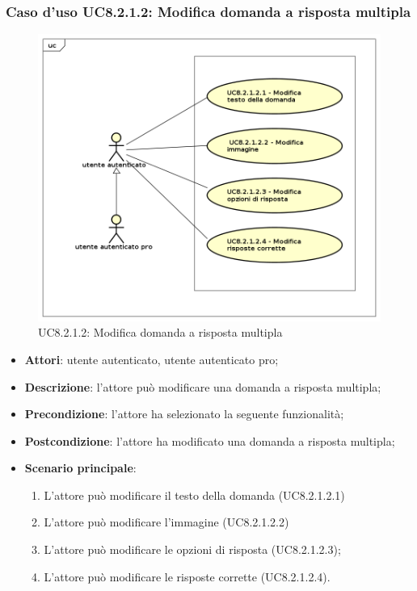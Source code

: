 \subsubsection{Caso d'uso UC8.2.1.2: Modifica domanda a risposta multipla}
	\label{UC8.2.1.2}
	\begin{figure}[h]
		\centering
			\includegraphics[scale=0.45,keepaspectratio]{UML/UC8_2_1_2.png}
		\caption{UC8.2.1.2: Modifica domanda a risposta multipla}
	\end{figure}
	\FloatBarrier
	\begin{itemize}
		\item
			\textbf{Attori}: utente autenticato, utente autenticato pro;
		\item		
			\textbf{Descrizione}: l'attore può modificare una domanda a risposta multipla;
		\item
			\textbf{Precondizione}: l'attore ha selezionato la seguente funzionalità; 
		\item
			\textbf{Postcondizione}: l'attore ha modificato una domanda a risposta multipla;
		\item
			\textbf{Scenario principale}:
	       		\begin{enumerate}
	       			\item
	       			L'attore può modificare il testo della domanda (UC8.2.1.2.1)
	       			\item
	       			L'attore può modificare l'immagine (UC8.2.1.2.2)
	       			\item
	       			L'attore può modificare le opzioni di risposta (UC8.2.1.2.3);
					\item
					L'attore può modificare le risposte corrette (UC8.2.1.2.4).
	 			\end{enumerate}
	\end{itemize}

